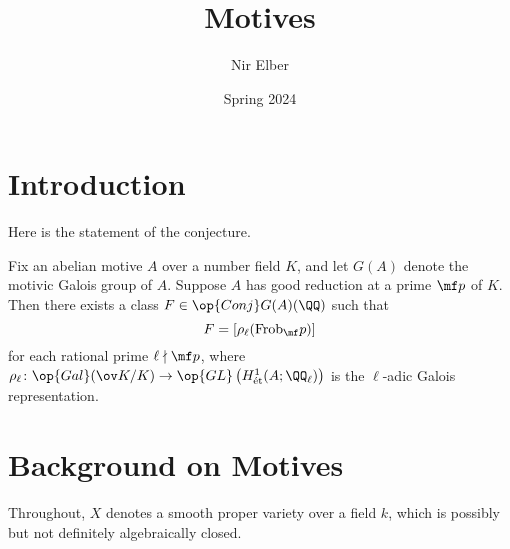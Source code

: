\documentclass{article}
\title{Motives}
\author{Nir Elber}
\date{Spring 2024}
\begin{document}
\maketitle

\tableofcontents

\section{Introduction}
Here is the statement of the conjecture.
\begin{conj} \label{conj:desired-conjecture}
	Fix an abelian motive $A$ over a number field $K$, and let $G(A)$ denote the motivic Galois group of $A$. Suppose $A$ has good reduction at a prime $\mf p$ of $K$. Then there exists a class $F\in\op{Conj}G(A)(\QQ)$ such that
	\[F=[\rho_\ell(\mathrm{Frob}_\mf p)]\]
	for each rational prime $\ell\nmid\mf p$, where $\rho_\ell\colon\op{Gal}(\ov K/K)\to\op{GL}\left(H^1_{\mathrm{\acute et}}(A;\QQ_\ell)\right)$ is the $\ell$-adic Galois representation.
\end{conj}

\section{Background on Motives}
Throughout, $X$ denotes a smooth proper variety over a field $k$, which is possibly but not definitely algebraically closed.
\end{document}
